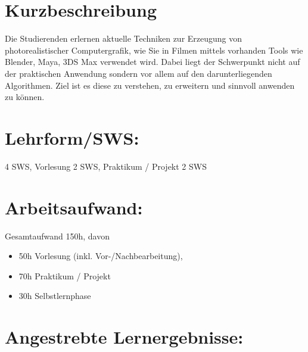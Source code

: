 \section*{Kurzbeschreibung}\label{kurzbeschreibung-12}

Die Studierenden erlernen aktuelle Techniken zur Erzeugung von
photorealistischer Computergrafik, wie Sie in Filmen mittels vorhanden
Tools wie Blender, Maya, 3DS Max verwendet wird. Dabei liegt der
Schwerpunkt nicht auf der praktischen Anwendung sondern vor allem auf
den darunterliegenden Algorithmen. Ziel ist es diese zu verstehen, zu
erweitern und sinnvoll anwenden zu können.

\section*{Lehrform/SWS:}\label{lehrformsws-17}

4 SWS, Vorlesung 2 SWS, Praktikum / Projekt 2 SWS

\section*{Arbeitsaufwand:}\label{arbeitsaufwand-22}

Gesamtaufwand 150h, davon

\begin{itemize}
\tightlist
\item
  50h Vorlesung (inkl. Vor-/Nachbearbeitung),
\item
  70h Praktikum / Projekt
\item
  30h Selbstlernphase
\end{itemize}

\section*{Angestrebte
Lernergebnisse:}\label{angestrebte-lernergebnisse-16}

